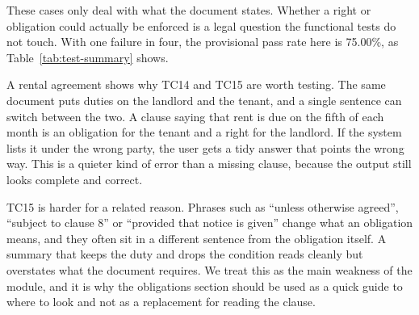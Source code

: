 \documentclass[12pt,a4paper,oneside]{report}
\begin{document}
These cases only deal with what the document states. Whether a right or obligation could actually be enforced is a legal question the functional tests do not touch. With one failure in four, the provisional pass rate here is 75.00\%, as Table~\ref{tab:test-summary} shows.

A rental agreement shows why TC14 and TC15 are worth testing. The same document puts duties on the landlord and the tenant, and a single sentence can switch between the two. A clause saying that rent is due on the fifth of each month is an obligation for the tenant and a right for the landlord. If the system lists it under the wrong party, the user gets a tidy answer that points the wrong way. This is a quieter kind of error than a missing clause, because the output still looks complete and correct.

TC15 is harder for a related reason. Phrases such as ``unless otherwise agreed'', ``subject to clause 8'' or ``provided that notice is given'' change what an obligation means, and they often sit in a different sentence from the obligation itself. A summary that keeps the duty and drops the condition reads cleanly but overstates what the document requires. We treat this as the main weakness of the module, and it is why the obligations section should be used as a quick guide to where to look and not as a replacement for reading the clause.

\end{document}
